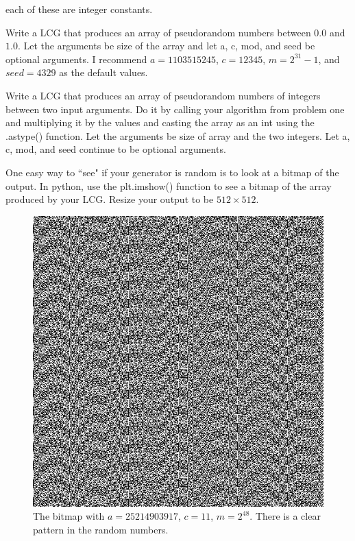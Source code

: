 each of these are integer constants.

\begin{problem}
Write a LCG that produces an array of pseudorandom numbers between $0.0$ and $1.0$.
Let the arguments be size of the array and let a, c, mod, and seed be optional arguments.
I recommend $a=1103515245$, $c=12345$, $m=2^{31}-1$, and $seed=4329$ as the default values.
\end{problem}

\begin{problem}
Write a LCG that produces an array of pseudorandom numbers of integers between two input arguments.
Do it by calling your algorithm from problem one and multiplying it by the values and casting the array as an int using the .astype() function.
Let the arguments be size of array and the two integers.
Let a, c, mod, and seed continue to be optional arguments.
\end{problem}

One easy way to ``see" if your generator is random is to look at a bitmap of the output.
In python, use the plt.imshow() function to see a bitmap of the array produced by your LCG.
Resize your output to be $512 \times 512$.

\begin{figure}[H]
\includegraphics[scale = .4]{PRNG1.jpg}
\caption{
The bitmap with $a=25214903917$, $c=11$, $m=2^{48}$.
There is a clear pattern in the random numbers.}
\end{figure}

